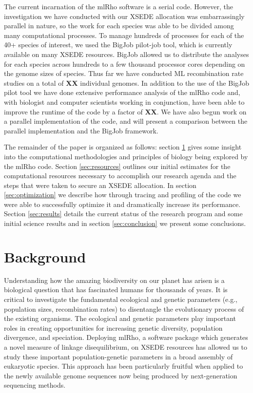 \documentclass{sig-alternate}
\begin{document}
The current incarnation of the mlRho software is a serial code. However, the investigation we have conducted
with our XSEDE allocation was embarrassingly parallel in nature, so the work for each species was able to be
divided among many computational processes. To manage hundreds of processes for each of the 40+ species of
interest, we used the BigJob pilot-job tool, which is currently available on many XSEDE resources. BigJob
allowed us to distribute the analyses for each species across hundreds to a few thousand processor cores
depending on the genome sizes of species. Thus far we have conducted ML recombination rate studies on a total
of {\bf XX} individual genomes. In addition to the use of the BigJob pilot tool we have done extensive performance
analysis of the mlRho code and, with biologist and computer scientists working in conjunction, have been able
to improve the runtime of the code by a factor of {\bf XX}. We have also begun work on a parallel
implementation of the code, and will present a comparison between the parallel implementation and the BigJob
framework.

The remainder of the paper is organized as follows: section \ref{sec:background} gives some insight into the
computational methodologies and principles of biology being explored by the mlRho code. Section
\ref{sec:resources} outlines our initial estimates for the computational resources necessary to accomplish our
research agenda and the steps that were taken to secure an XSEDE allocation. In section \ref{sec:optimization}
we describe how through tracing and profiling of the code we were able to successfully optimize it and
dramatically increase its performance. Section \ref{sec:results} details the current status of the research
program and some initial science results and in section \ref{sec:conclusion} we present some conclusions.


\section{Background}\label{sec:background}
Understanding how the amazing biodiversity on our planet has arisen is a biological question that has
fascinated humans for thousands of years. It is critical to investigate the fundamental ecological and genetic
parameters (e.g., population sizes, recombination rates) to disentangle the evolutionary process of the
existing organisms. The ecological and genetic parameters play important roles in creating opportunities for
increasing genetic diversity, population divergence, and speciation. Deploying mlRho, a software package which
generates a novel measure of linkage disequilibrium, on XSEDE resources has allowed us to study these
important population-genetic parameters in a broad assembly of eukaryotic species. This approach has been
particularly fruitful when applied to the newly available genome sequences now being produced by
next-generation sequencing methods.
\end{document}
